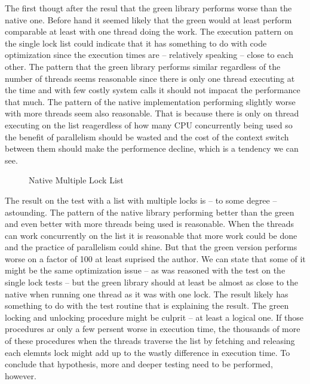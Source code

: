 \documentclass{article}
\begin{document}
The first thougt after the resul that the green library performs worse than the native one. Before hand it seemed likely that the green would at least perform comparable at least with one thread doing the work. The execution pattern on the single lock list could indicate that it has something to do with code optimization since the execution times are – relatively speaking – close to each other. The pattern that the green library performs similar regardless of the number of threads seems reasonable since there is only one thread executing at the time and with few costly system calls it should not impacat the performance that much. The pattern of the native implementation performing slightly worse with more threads seem also reasonable. That is because there is only on thread executing on the list reagerdless of how many CPU concurrently being used so the benefit of parallelism should be wasted and the cost of the context switch between them should make the performence decline, which is a tendency we can see.

\begin{figure}
\hspace{4em}
\caption{Native Multiple Lock List}
\end{figure}

The result on the test with a list with multiple locks is – to some degree – astounding. The pattern of the native library performing better than the green and even better with more threads being used is reasonable. When the threads can work concurrently on the list it is reasonable that more work could be done and the practice of parallelism could shine. But that the green version performs worse on a factor of 100 at least suprised the author. We can state that some of it might be the same optimization issue – as was reasoned with the test on the single lock tests – but the green library should at least be almost as close to the native when running one thread as it was with one lock. The result likely has something to do with the test routine that is explaining the result. The green locking and unlocking procedure might be culprit – at least a logical one. If those procedures ar only a few persent worse in execution time, the thousands of more of these procedures when the threads traverse the list by fetching and releasing each elemnts lock might add up to the wastly difference in execution time. To conclude that hypothesis, more and deeper testing need to be performed, however.
\end{document}

